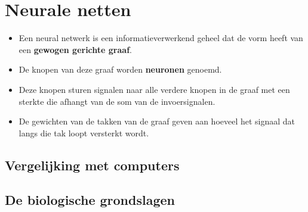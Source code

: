 \chapter{Neurale netten}
\begin{itemize}
	\item Een neural netwerk is een informatieverwerkend geheel dat de vorm heeft van een \textbf{gewogen gerichte graaf}.
	\item De knopen van deze graaf worden \textbf{neuronen} genoemd.
	\item Deze knopen sturen signalen naar alle verdere knopen in de graaf met een sterkte die afhangt van de som van de invoersignalen.
	\item De gewichten van de takken van de graaf geven aan hoeveel het signaal dat langs die tak loopt versterkt wordt.
\end{itemize}


\section{Vergelijking met computers}

\section{De biologische grondslagen}